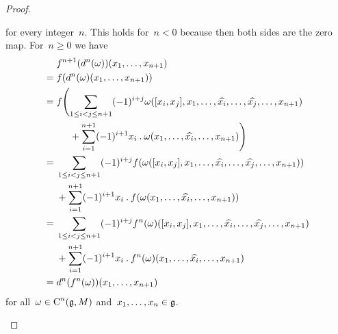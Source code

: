 \begin{proof}
\begin{enumerate}
      for every integer~$n$.
      This holds for~$n < 0$ because then both sides are the zero map.
      For~$n \geq 0$ we have
      \begin{align*}
        {}&
        f^{n+1}( d^n(\omega) )(x_1, \dotsc, x_{n+1})
        \\
        ={}&
        f( d^n(\omega)(x_1, \dotsc, x_{n+1}) )
        \\
        ={}&
        f
        \Biggl(
          \sum_{1 \leq i < j \leq n+1}
          (-1)^{i+j}
          \omega( [x_i, x_j], x_1, \dotsc, \widehat{x_i}, \dotsc, \widehat{x_j}, \dotsc, x_{n+1} )
        \\
        {}&
        \phantom{
          f
          \Biggl(
        }
          +
          \sum_{i=1}^{n+1}
          (-1)^{i+1}
          x_i \mathbin{.} \omega(x_1, \dotsc, \widehat{x_i}, \dotsc, x_{n+1})
        \Biggr)
        \\
        ={}&
        \sum_{1 \leq i < j \leq n+1}
        (-1)^{i+j}
        f( \omega( [x_i, x_j], x_1, \dotsc, \widehat{x_i}, \dotsc, \widehat{x_j}, \dotsc, x_{n+1} ) )
        \\
        {}&
        +
        \sum_{i=1}^{n+1}
        (-1)^{i+1}
        x_i \mathbin{.} f( \omega(x_1, \dotsc, \widehat{x_i}, \dotsc, x_{n+1}) )
        \\
        ={}&
        \sum_{1 \leq i < j \leq n+1}
        (-1)^{i+j}
        f^n(\omega)( [x_i, x_j], x_1, \dotsc, \widehat{x_i}, \dotsc, \widehat{x_j}, \dotsc, x_{n+1} )
        \\
        {}&
        +
        \sum_{i=1}^{n+1}
        (-1)^{i+1}
        x_i \mathbin{.} f^n(\omega)(x_1, \dotsc, \widehat{x_i}, \dotsc, x_{n+1})
        \\
        ={}&
        d^n( f^n(\omega) )(x_1, \dotsc, x_{n+1})
      \end{align*}
      for all~$\omega \in \operatorname{C}^n(\mathfrak{g}, M)$ and~$x_1, \dotsc, x_n \in \mathfrak{g}$.
    \qedhere
  \end{enumerate}
\end{proof}


